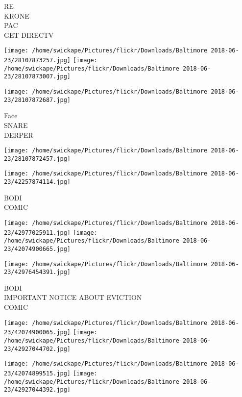 \documentclass[10pt,letterpaper]{article}
\begin{document}
RE\\
KRONE\\
PAC\\
GET DIRECTV\\
\pagebreak

\texttt{[image: /home/swickape/Pictures/flickr/Downloads/Baltimore 2018-06-23/28107873257.jpg]}
\texttt{[image: /home/swickape/Pictures/flickr/Downloads/Baltimore 2018-06-23/28107873007.jpg]}

\vspace{0.25in}
\texttt{[image: /home/swickape/Pictures/flickr/Downloads/Baltimore 2018-06-23/28107872687.jpg]}

Face\\
SNARE\\
DERPER\\
\pagebreak

\texttt{[image: /home/swickape/Pictures/flickr/Downloads/Baltimore 2018-06-23/28107872457.jpg]}

\vspace{0.25in}
\texttt{[image: /home/swickape/Pictures/flickr/Downloads/Baltimore 2018-06-23/42257874114.jpg]}

BODI\\
COMIC\\
\pagebreak

\texttt{[image: /home/swickape/Pictures/flickr/Downloads/Baltimore 2018-06-23/42977025911.jpg]}
\texttt{[image: /home/swickape/Pictures/flickr/Downloads/Baltimore 2018-06-23/42074900665.jpg]}

\vspace{0.25in}
\texttt{[image: /home/swickape/Pictures/flickr/Downloads/Baltimore 2018-06-23/42976454391.jpg]}

BODI\\
IMPORTANT NOTICE ABOUT EVICTION\\
COMIC\\
\pagebreak

\texttt{[image: /home/swickape/Pictures/flickr/Downloads/Baltimore 2018-06-23/42074900065.jpg]}
\texttt{[image: /home/swickape/Pictures/flickr/Downloads/Baltimore 2018-06-23/42927044702.jpg]}

\texttt{[image: /home/swickape/Pictures/flickr/Downloads/Baltimore 2018-06-23/42074899515.jpg]}
\texttt{[image: /home/swickape/Pictures/flickr/Downloads/Baltimore 2018-06-23/42927044392.jpg]}
\end{document}

